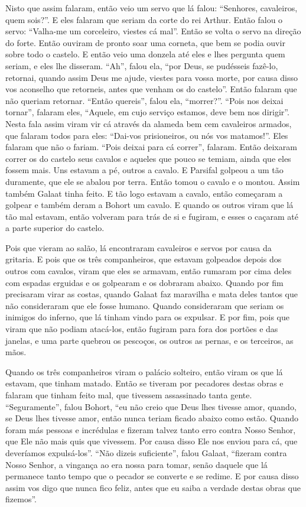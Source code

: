Nisto que assim falaram, então veio um servo que lá falou: “Senhores,
cavaleiros, quem sois?”. E eles falaram que seriam da corte do rei Arthur. Então
falou o servo: “Valha-me um corceleiro, viestes cá mal”. Então se volta o servo
na direção do forte. Então ouviram de pronto soar uma corneta, que bem se podia
ouvir sobre todo o castelo. E então veio uma donzela até eles e lhes pergunta
quem seriam, e eles lhe disseram. “Ah”, falou ela, “por Deus, se pudésseis
fazê-lo, retornai, quando assim Deus me ajude, viestes para vossa morte, por
causa disso vos aconselho que retorneis, antes que venham os do castelo”. Então
falaram que não queriam retornar. “Então quereis”, falou ela, “morrer?”. “Pois
nos deixai tornar”, falaram eles, “Aquele, em cujo serviço estamos, deve bem
nos dirigir”. Nesta fala assim viram vir cá  através da alameda bem cem
cavaleiros armados, que falaram todos para eles: “Dai-vos prisioneiros, ou nós
vos matamos!”. Eles falaram que não o fariam. “Pois deixai para cá correr”,
falaram. Então deixaram correr os do castelo seus cavalos e aqueles que pouco
se temiam, ainda que eles fossem mais. Uns estavam a pé, outros a cavalo. E
Parsifal golpeou a um tão duramente, que ele se abalou por terra. Então tomou
o cavalo e o montou. Assim também Galaat tinha feito. E tão logo estavam a
cavalo, então começaram a golpear e também deram a Bohort um cavalo. E quando
os outros viram que lá tão mal estavam, então volveram para trás de si e
fugiram, e esses o caçaram até a parte superior do castelo.

Pois que vieram ao salão, lá encontraram cavaleiros e servos por causa da
gritaria. E pois que os três companheiros, que estavam golpeados depois dos
outros com cavalos, viram que eles se armavam, então rumaram por cima deles com
espadas erguidas e os golpearam e os dobraram abaixo. Quando por fim precisaram
virar as costas, quando Galaat faz maravilha e mata deles tantos que não
consideraram que ele fosse humano. Quando consideraram que seriam os inimigos
do inferno, que lá tinham vindo para os expulsar. E por fim, pois que viram que
não podiam atacá-los, então fugiram para fora dos portões e das janelas, e uma
parte quebrou os pescoços, os outros as pernas, e os terceiros, as mãos. 

Quando os três companheiros viram o palácio solteiro, então viram os que lá
estavam, que tinham matado. Então se tiveram por pecadores destas obras e
falaram que tinham feito mal, que tivessem assassinado tanta gente.
“Seguramente”, falou Bohort, “eu não creio que Deus lhes tivesse amor, quando,
se Deus lhes tivesse amor, então nunca teriam ficado abaixo como estão. Quando
foram más pessoas e incrédulas e fizeram talvez tanto erro contra Nosso Senhor,
que Ele não mais quis que vivessem. Por causa disso Ele nos enviou para cá, que
deveríamos expulsá-los”. “Não dizeis suficiente”, falou Galaat, “fizeram contra
Nosso Senhor, a vingança ao era nossa para tomar, senão daquele que lá
permanece tanto tempo que o pecador se converte e se redime. E por causa disso
assim vos digo que nunca fico feliz, antes que eu saiba a verdade destas obras
que fizemos”. 

